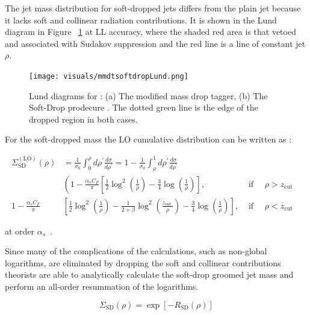 The jet mass distribution for soft-dropped jets differs from the plain jet because it lacks soft and collinear radiation contributions. It is shown in the Lund diagram in Figure ~\ref{fig:mmdtsoftdropLund} at LL accuracy, where the shaded red area is that vetoed and associated with Sudakov suppression and the red line is a line of constant jet $\rho$.

\begin{figure}[htb]
\centering
\texttt{[image: visuals/mmdtsoftdropLund.png]}
\caption{Lund diagrams for : (a) The modified mass drop tagger, (b) The Soft-Drop prodecure . The dotted green line is the edge of the dropped region in both cases. }
\label{fig:mmdtsoftdropLund}
\end{figure}

For the soft-dropped mass the LO cumulative distribution can be written as :\newline

\begin{equation}
\begin{aligned} \Sigma_{\mathrm{SD}}^{(\mathrm{LO})}(\rho) &=\frac{1}{\sigma_{0}} \int_{0}^{\rho} d \rho^{\prime} \frac{d \sigma}{d \rho^{\prime}}=1-\frac{1}{\sigma_{0}} \int_{\rho}^{1} d \rho^{\prime} \frac{d \sigma}{d \rho^{\prime}} & & \\ &\left(1-\frac{\alpha_{s} C_{F}}{\pi}\left[\frac{1}{2} \log ^{2}\left(\frac{1}{\rho}\right)-\frac{3}{4} \log \left(\frac{1}{\rho}\right)\right],\right.& \text { if } \quad \rho>z_{\mathrm{cut}} \\ 1-\frac{\alpha_{s} C_{F}}{\pi} &\left[\frac{1}{2} \log ^{2}\left(\frac{1}{\rho}\right)-\frac{1}{2+\beta} \log ^{2}\left(\frac{z_{\text {cut }}}{\rho}\right)-\frac{3}{4} \log \left(\frac{1}{\rho}\right)\right], & \text { if } \quad \rho<z_{\text {cut }} \end{aligned}
\end{equation}

at order $\alpha_s$~\cite{Marzani:2019hun}.

Since many of the complications of the calculations, such as non-global logarithms, are eliminated by dropping the soft and collinear contributions theorists are able to analytically calculate the soft-drop groomed jet mass and perform an all-order resummation of the logarithms.

\begin{equation}
\Sigma_{\mathrm{SD}}(\rho)=\exp \left[-R_{\mathrm{SD}}(\rho)\right]
\end{equation}




